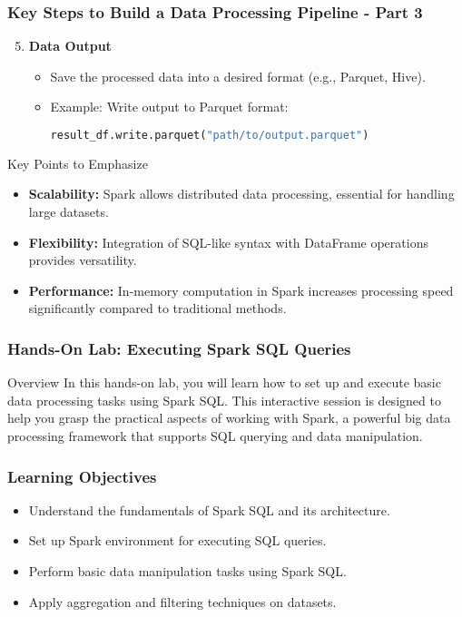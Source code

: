 \documentclass[aspectratio=169]{beamer}
\begin{document}
\begin{frame}[fragile]
  \frametitle{Key Steps to Build a Data Processing Pipeline - Part 3}
  \begin{enumerate}
    \setcounter{enumi}{4} %
    \item \textbf{Data Output}
      \begin{itemize}
        \item Save the processed data into a desired format (e.g., Parquet, Hive).
        \item Example: Write output to Parquet format:
        \begin{lstlisting}[language=python]
result_df.write.parquet("path/to/output.parquet")
        \end{lstlisting}
      \end{itemize}
  \end{enumerate}

  \begin{block}{Key Points to Emphasize}
    \begin{itemize}
      \item \textbf{Scalability:} Spark allows distributed data processing, essential for handling large datasets.
      \item \textbf{Flexibility:} Integration of SQL-like syntax with DataFrame operations provides versatility.
      \item \textbf{Performance:} In-memory computation in Spark increases processing speed significantly compared to traditional methods.
    \end{itemize}
  \end{block}
\end{frame}

\begin{frame}
  \frametitle{Hands-On Lab: Executing Spark SQL Queries}
  \begin{block}{Overview}
    In this hands-on lab, you will learn how to set up and execute basic data processing tasks using Spark SQL. This interactive session is designed to help you grasp the practical aspects of working with Spark, a powerful big data processing framework that supports SQL querying and data manipulation.
  \end{block}
\end{frame}

\begin{frame}
  \frametitle{Learning Objectives}
  \begin{itemize}
    \item Understand the fundamentals of Spark SQL and its architecture.
    \item Set up Spark environment for executing SQL queries.
    \item Perform basic data manipulation tasks using Spark SQL.
    \item Apply aggregation and filtering techniques on datasets.
  \end{itemize}
\end{frame}
\end{document}
